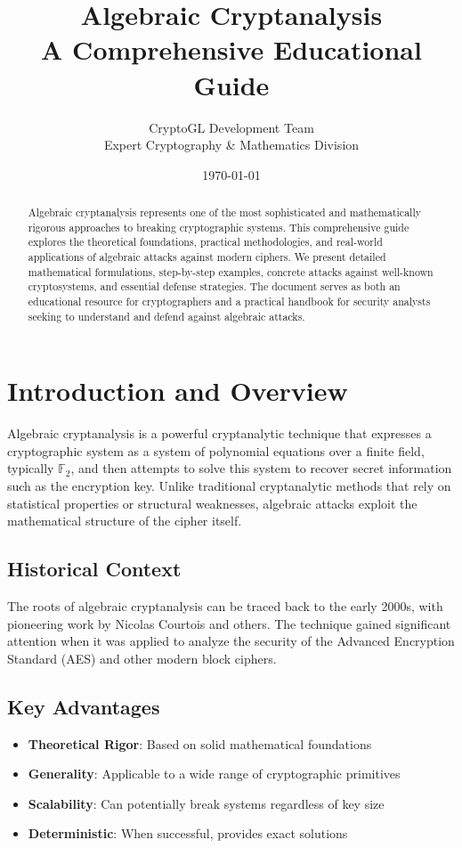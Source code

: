 \documentclass[12pt,a4paper]{article}
\title{\huge\textbf{Algebraic Cryptanalysis}\\
       \Large A Comprehensive Educational Guide}
\author{CryptoGL Development Team\\
        Expert Cryptography \& Mathematics Division}
\date{\today}
\newcommand{\GF}[1]{\mathbb{F}_{#1}}
\begin{document}
\maketitle

\begin{abstract}
Algebraic cryptanalysis represents one of the most sophisticated and mathematically rigorous approaches to breaking cryptographic systems. This comprehensive guide explores the theoretical foundations, practical methodologies, and real-world applications of algebraic attacks against modern ciphers. We present detailed mathematical formulations, step-by-step examples, concrete attacks against well-known cryptosystems, and essential defense strategies. The document serves as both an educational resource for cryptographers and a practical handbook for security analysts seeking to understand and defend against algebraic attacks.
\end{abstract}

\tableofcontents
\newpage

\section{Introduction and Overview}

Algebraic cryptanalysis is a powerful cryptanalytic technique that expresses a cryptographic system as a system of polynomial equations over a finite field, typically $\GF{2}$, and then attempts to solve this system to recover secret information such as the encryption key. Unlike traditional cryptanalytic methods that rely on statistical properties or structural weaknesses, algebraic attacks exploit the mathematical structure of the cipher itself.

\subsection{Historical Context}

The roots of algebraic cryptanalysis can be traced back to the early 2000s, with pioneering work by Nicolas Courtois and others. The technique gained significant attention when it was applied to analyze the security of the Advanced Encryption Standard (AES) and other modern block ciphers.

\subsection{Key Advantages}

\begin{itemize}
    \item \textbf{Theoretical Rigor}: Based on solid mathematical foundations
    \item \textbf{Generality}: Applicable to a wide range of cryptographic primitives
    \item \textbf{Scalability}: Can potentially break systems regardless of key size
    \item \textbf{Deterministic}: When successful, provides exact solutions
\end{itemize}
\end{document}
